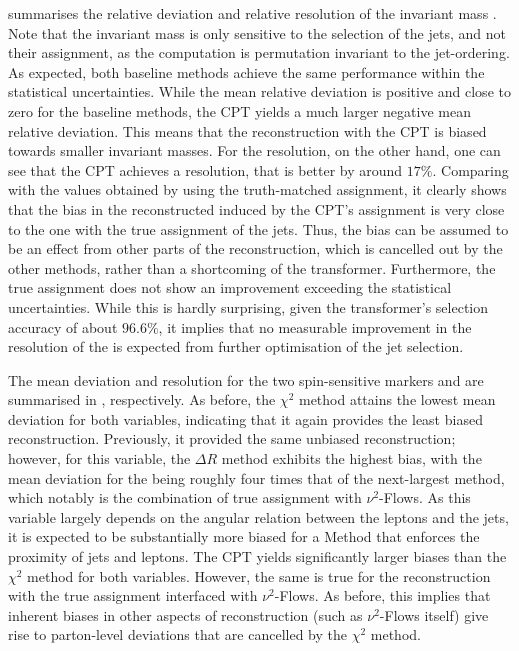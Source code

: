  summarises the relative deviation and relative resolution of the invariant mass \mttbar.
Note that the invariant mass is only sensitive to the selection of the jets, and not their assignment, as the computation is permutation invariant to the jet-ordering. As expected, both baseline methods achieve the same performance within the statistical uncertainties.
While the mean relative deviation is positive and close to zero for the baseline methods, the CPT yields a much larger negative mean relative deviation. This means that the reconstruction with the CPT is biased towards smaller invariant masses. For the resolution, on the other hand, one can see that the CPT achieves a resolution, that is better by around $17\%$. Comparing with the values obtained by using the truth-matched assignment, it clearly shows that the bias in the reconstructed \mttbar induced by the CPT's assignment is very close to the one with the true assignment of the jets. Thus, the bias can be assumed to be an effect from other parts of the reconstruction, which is cancelled out by the other methods, rather than a shortcoming of the transformer. Furthermore, the true assignment does not show an improvement exceeding the statistical uncertainties. While this is hardly surprising, given the transformer's selection accuracy of about $96.6\%$, it implies that no measurable improvement in the resolution of the \mttbar is expected from further optimisation of the jet selection.

The mean deviation and resolution for the two spin-sensitive markers \chel and \chan are summarised in ,
respectively. As before, the $\chi^2$ method attains the lowest mean deviation for both variables, indicating that it again provides the least biased reconstruction. Previously, it provided the same unbiased reconstruction; however, for this variable, the $\Delta R$ method exhibits the highest bias, with the mean deviation for the \chan being roughly four times that of the next-largest method, which notably is the combination of true assignment with $\nu^2$-Flows. As this variable largely depends on the angular relation between the leptons and the jets, it is expected to be substantially more biased for a Method that enforces the proximity of jets and leptons. The CPT yields significantly larger biases than the $\chi^2$ method for both variables. However, the same is true for the reconstruction with the true assignment interfaced with $\nu^2$-Flows. As before, this implies that inherent biases in other aspects of reconstruction (such as $\nu^2$-Flows itself) give rise to parton-level deviations that are cancelled by the $\chi^2$ method.

